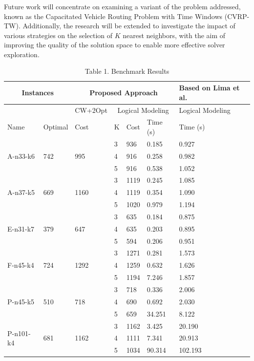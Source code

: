 \documentclass[10pt]{article}
\begin{document}
Future work will concentrate on examining a variant of the problem addressed, known as the Capacitated Vehicle Routing Problem with Time Windows (CVRP-TW). Additionally, the research will be extended to investigate the impact of various strategies on the selection of $K$ nearest neighbors, with the aim of improving the quality of the solution space to enable more effective solver exploration.

\begin{table}[h]
\begin{center}
\captionsetup{labelformat=empty}
\caption{Table 1. Benchmark Results}
\begin{tabular}{|l|l|l|l|l|l|l|}
\hline
\multicolumn{2}{|c|}{\multirow{2}{*}{Instances}} & \multicolumn{4}{|c|}{Proposed Approach} & Based on Lima et al. \\
\hline
 &  & CW+2Opt & \multicolumn{3}{|c|}{Logical Modeling} & Logical Modeling \\
\hline
Name & Optimal & Cost & K & Cost & Time (s) & Time (s) \\
\hline
\multirow{3}{*}{A-n33-k6} & \multirow{3}{*}{742} & \multirow{3}{*}{995} & 3 & 936 & 0.185 & 0.927 \\
\hline
 &  &  & 4 & 916 & 0.258 & 0.982 \\
\hline
 &  &  & 5 & 916 & 0.538 & 1.052 \\
\hline
\multirow{3}{*}{A-n37-k5} & \multirow{3}{*}{669} & \multirow{3}{*}{1160} & 3 & 1119 & 0.245 & 1.085 \\
\hline
 &  &  & 4 & 1119 & 0.354 & 1.090 \\
\hline
 &  &  & 5 & 1020 & 0.979 & 1.194 \\
\hline
\multirow{3}{*}{E-n31-k7} & \multirow{3}{*}{379} & \multirow{3}{*}{647} & 3 & 635 & 0.184 & 0.875 \\
\hline
 &  &  & 4 & 635 & 0.203 & 0.895 \\
\hline
 &  &  & 5 & 594 & 0.206 & 0.951 \\
\hline
\multirow{3}{*}{F-n45-k4} & \multirow{3}{*}{724} & \multirow{3}{*}{1292} & 3 & 1271 & 0.281 & 1.573 \\
\hline
 &  &  & 4 & 1259 & 0.632 & 1.626 \\
\hline
 &  &  & 5 & 1194 & 7.246 & 1.857 \\
\hline
\multirow{3}{*}{P-n45-k5} & \multirow{3}{*}{510} & \multirow{3}{*}{718} & 3 & 718 & 0.336 & 2.006 \\
\hline
 &  &  & 4 & 690 & 0.692 & 2.030 \\
\hline
 &  &  & 5 & 659 & 34.251 & 8.122 \\
\hline
\multirow{3}{*}{P-n101-k4} & \multirow{3}{*}{681} & \multirow{3}{*}{1162} & 3 & 1162 & 3.425 & 20.190 \\
\hline
 &  &  & 4 & 1111 & 7.341 & 20.913 \\
\hline
 &  &  & 5 & 1034 & 90.314 & 102.193 \\
\hline
\end{tabular}
\end{center}
\end{table}
\end{document}
